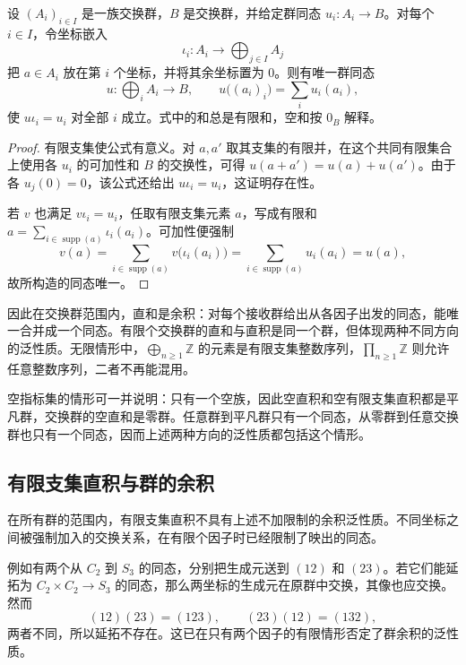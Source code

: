 \begin{proposition}[交换群直和的泛性质]\label{b1:prop:abelian-sum-universal}
	设 \((A_i)_{i\in I}\) 是一族交换群，\(B\) 是交换群，并给定群同态 \(u_i:A_i\rightarrow B\)。对每个 \(i\in I\)，令坐标嵌入
	\[
		\iota_i:A_i\longrightarrow\bigoplus_{j\in I}A_j
	\]
	把 \(a\in A_i\) 放在第 \(i\) 个坐标，并将其余坐标置为 \(0\)。则有唯一群同态
	\[
		u:\bigoplus_iA_i\longrightarrow B,\qquad u\bigl((a_i)_i\bigr)=\sum_i u_i(a_i),
	\]
	使 \(u\iota_i=u_i\) 对全部 \(i\) 成立。式中的和总是有限和，空和按 \(0_B\) 解释。
\end{proposition}
\begin{proof}
	有限支集使公式有意义。对 \(a,a'\) 取其支集的有限并，在这个共同有限集合上使用各 \(u_i\) 的可加性和 \(B\) 的交换性，可得 \(u(a+a')=u(a)+u(a')\)。由于各 \(u_j(0)=0\)，该公式还给出 \(u\iota_i=u_i\)，这证明存在性。

	若 \(v\) 也满足 \(v\iota_i=u_i\)，任取有限支集元素 \(a\)，写成有限和 \(a=\sum_{i\in\operatorname{supp}(a)}\iota_i(a_i)\)。可加性便强制
	\[
		v(a)=\sum_{i\in\operatorname{supp}(a)}v\bigl(\iota_i(a_i)\bigr) =\sum_{i\in\operatorname{supp}(a)}u_i(a_i)=u(a),
	\]
	故所构造的同态唯一。

\end{proof}

因此在交换群范围内，直和是余积：对每个接收群给出从各因子出发的同态，能唯一合并成一个同态。有限个交换群的直和与直积是同一个群，但体现两种不同方向的泛性质。无限情形中，\(\bigoplus_{n\geq1}\mathbb Z\) 的元素是有限支集整数序列，\(\prod_{n\geq1}\mathbb Z\) 则允许任意整数序列，二者不再能混用。

\ProseParagraphBreak
空指标集的情形可一并说明：只有一个空族，因此空直积和空有限支集直积都是平凡群，交换群的空直和是零群。任意群到平凡群只有一个同态，从零群到任意交换群也只有一个同态，因而上述两种方向的泛性质都包括这个情形。

\subsection{有限支集直积与群的余积}
\label{b1:subsec:0601:04}

在所有群的范围内，有限支集直积不具有上述不加限制的余积泛性质。不同坐标之间被强制加入的交换关系，在有限个因子时已经限制了映出的同态。

\ProseParagraphBreak
例如有两个从 \(C_2\) 到 \(S_3\) 的同态，分别把生成元送到 \((12)\) 和 \((23)\)。若它们能延拓为 \(C_2\times C_2\rightarrow S_3\) 的同态，那么两坐标的生成元在原群中交换，其像也应交换。然而
\[
	(12)(23)=(123),\qquad(23)(12)=(132),
\]
两者不同，所以延拓不存在。这已在只有两个因子的有限情形否定了群余积的泛性质。

